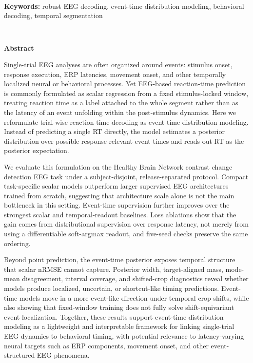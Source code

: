 \documentclass[12pt]{article}
\begin{document}
\ \\[-2mm]
{\bf Keywords:} robust EEG decoding, event-time distribution modeling, behavioral decoding, temporal segmentation

\thispagestyle{empty}
%
\ \vspace{-0mm}\\
%
\begin{center} {\bf Abstract} \end{center}



Single-trial EEG analyses are often organized around events: stimulus onset, response execution, ERP latencies, movement onset, and other temporally localized neural or behavioral processes. Yet EEG-based reaction-time prediction is commonly formulated as scalar regression from a fixed stimulus-locked window, treating reaction time as a label attached to the whole segment rather than as the latency of an event unfolding within the post-stimulus dynamics. Here we reformulate trial-wise reaction-time decoding as event-time distribution modeling. Instead of predicting a single RT directly, the model estimates a posterior distribution over possible response-relevant event times and reads out RT as the posterior expectation.

We evaluate this formulation on the Healthy Brain Network contrast change detection EEG task under a subject-disjoint, release-separated protocol. Compact task-specific scalar models outperform larger supervised EEG architectures trained from scratch, suggesting that architecture scale alone is not the main bottleneck in this setting. Event-time supervision further improves over the strongest scalar and temporal-readout baselines. Loss ablations show that the gain comes from distributional supervision over response latency, not merely from using a differentiable soft-argmax readout, and five-seed checks preserve the same ordering.

Beyond point prediction, the event-time posterior exposes temporal structure that scalar nRMSE cannot capture. Posterior width, target-aligned mass, mode-mean disagreement, interval coverage, and shifted-crop diagnostics reveal whether models produce localized, uncertain, or shortcut-like timing predictions. Event-time models move in a more event-like direction under temporal crop shifts, while also showing that fixed-window training does not fully solve shift-equivariant event localization. Together, these results support event-time distribution modeling as a lightweight and interpretable framework for linking single-trial EEG dynamics to behavioral timing, with potential relevance to latency-varying neural targets such as ERP components, movement onset, and other event-structured EEG phenomena.
\end{document}
